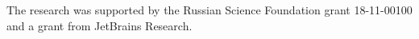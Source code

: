 \documentclass[12pt,a4paper]{cibb}
\begin{document}
The research was supported by the Russian Science Foundation grant 18-11-00100 and a grant from JetBrains Research.



%


{\fontsize{10}{10}\selectfont
\setlength{\parskip}{0pt}



}
\end{document}
